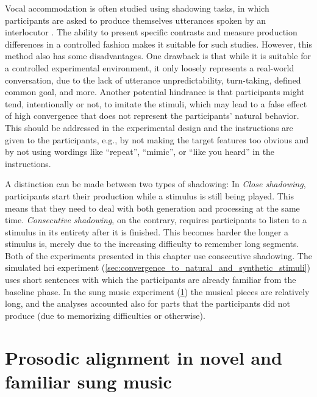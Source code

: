 Vocal accommodation is often studied using shadowing tasks, in which participants are asked to produce themselves utterances spoken by an interlocutor \citep[e.g.,][]{Pardo2018comparison, Babel2014novelty, Shockley2004imitation, Walker2015repeat, Dias2016visibilivty, Dias2016visibilivty}.
The ability to present specific contrasts and measure production differences in a controlled fashion makes it suitable for such studies.
However, this method also has some disadvantages.
One drawback is that while it is suitable for a controlled experimental environment, it only loosely represents a real-world conversation, due to the lack of utterance unpredictability, turn-taking, defined common goal, and more.
Another potential hindrance is that participants might tend, intentionally or not, to imitate the stimuli, which may lead to a false effect of high convergence that does not represent the participants' natural behavior.
This should be addressed in the experimental design and the instructions are given to the participants, e.g., by not making the target features too obvious and by not using wordings like \enquote{repeat}, \enquote{mimic}, or \enquote{like you heard} in the instructions.

A distinction can be made between two types of shadowing:
In \emph{Close shadowing}, participants start their production while a stimulus is still being played.
This means that they need to deal with both generation and processing at the same time.
\emph{Consecutive shadowing}, on the contrary, requires participants to listen to a stimulus in its entirety after it is finished.
This becomes harder the longer a stimulus is, merely due to the increasing difficulty to remember long segments.
Both of the experiments presented in this chapter use consecutive shadowing.
The simulated \ac{hci} experiment (\cref{sec:convergence_to_natural_and_synthetic_stimuli}) uses short sentences with which the participants are already familiar from the baseline phase. 
In the sung music experiment (\cref{sec:alignment_in_novel_and_familiar_sung_music}) the musical pieces are relatively long, and the analyses accounted also for parts that the participants did not produce (due to memorizing difficulties or otherwise).

\section{Prosodic alignment in novel and familiar sung music}
\label{sec:alignment_in_novel_and_familiar_sung_music}

